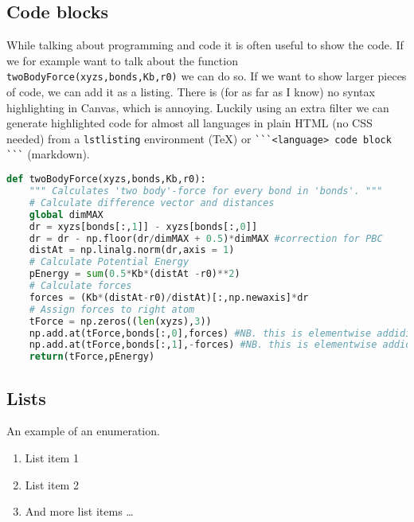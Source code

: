 \documentclass[11pt, a4paper]{article}
\begin{document}
	
	\subsection{Code blocks}
	While talking about programming and code it is often useful to show the code. If we for example want to talk about the function \lstinline{twoBodyForce(xyzs,bonds,Kb,r0)} we can do so. If we want to show larger pieces of code, we can add it as a listing. There is (for as far as I know) no syntax highlighting in Canvas, which is annoying. Luckily using an extra filter we can generate highlighted code for almost all languages in plain HTML (no CSS needed) from a \lstinline{lstlisting}  environment (TeX) or \lstinline{```<language> code block ```} (markdown).
	
\begin{lstlisting}[language=python]
def twoBodyForce(xyzs,bonds,Kb,r0):
	""" Calculates 'two body'-force for every bond in 'bonds'. """
	# Calculate difference vector and distances
	global dimMAX
	dr = xyzs[bonds[:,1]] - xyzs[bonds[:,0]]
	dr = dr - np.floor(dr/dimMAX + 0.5)*dimMAX #correction for PBC
	distAt = np.linalg.norm(dr,axis = 1)
	# Calculate Potential Energy
	pEnergy = sum(0.5*Kb*(distAt -r0)**2)
	# Calculate forces
	forces = (Kb*(distAt-r0)/distAt)[:,np.newaxis]*dr
	# Assign forces to right atom
	tForce = np.zeros((len(xyzs),3))
	np.add.at(tForce,bonds[:,0],forces) #NB. this is elementwise addiditon UNBUFFERED
	np.add.at(tForce,bonds[:,1],-forces) #NB. this is elementwise addiditon UNBUFFERED
	return(tForce,pEnergy)
\end{lstlisting}
	
	\subsection{Lists}
	An example of an enumeration.
	\begin{enumerate}
		\item List item 1 
		\item List item 2
		\item And more list items \ldots
	\end{enumerate}
	
\end{document}

